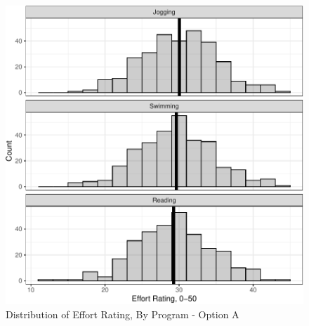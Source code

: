 \documentclass[
]{article}
\begin{document}
\begin{figure}[hb]

\includegraphics{Appendix_ex_weightloss_files/figure-latex/unnamed-chunk-53-1} \hfill{}

\caption{Distribution of Effort Rating, By Program - Option A}\label{fig:unnamed-chunk-53}
\end{figure}

\clearpage
\end{document}
